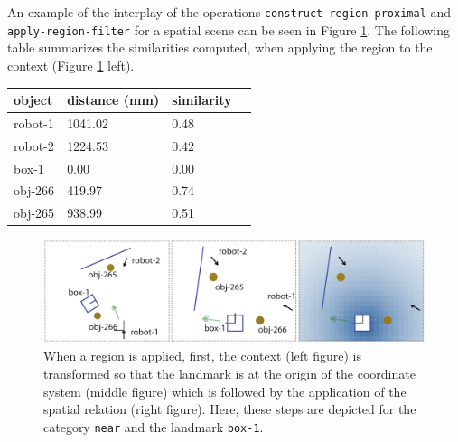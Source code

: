 An example of the interplay of the operations 
{\footnotesize\tt construct-region-proximal} 
and {\footnotesize\tt apply-region-filter} for
a spatial scene can be seen in Figure 
\ref{f:apply-proximal-region}. The following table 
summarizes the similarities computed, when applying 
the region to the context (Figure \ref{f:apply-proximal-region}
left).

\begin{center}
\begin{tabular}{| l | l | l | l |}
\hline
object & distance (mm) & similarity \\
\hline
robot-1 & 1041.02 & 0.48 \\
robot-2 & 1224.53 & 0.42 \\
box-1 & 0.00 & 0.00\\
obj-266 & 419.97 & 0.74\\
obj-265 & 938.99 & 0.51 \\
\hline
\end{tabular}
\end{center}


\begin{figure}
\begin{centering}
\includegraphics[width=1\columnwidth]{figs/space-scene-3-speaker-apply-proximal-region.pdf}
\end{centering}
\caption[Steps involved in applying a spatial relations.]
{When a region is applied, first, the context (left figure) is transformed so that
the landmark is at the origin of the coordinate system (middle figure) which is followed by the 
application of the spatial relation (right figure). Here, these steps are 
depicted for the category {\footnotesize\tt near} and the landmark {\footnotesize\tt box-1}.}
\label{f:apply-proximal-region}
\end{figure}

